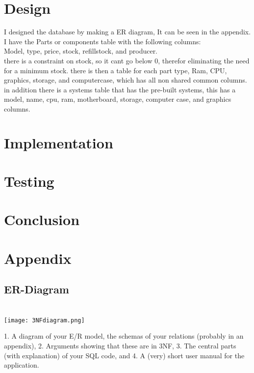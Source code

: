 \documentclass[a4paper,10pt,titlepage]{report}
\begin{document}
\section{Design}
I designed the database by making a ER diagram, It can be seen in the appendix.
I have the Parts or components table with the following columns:
\\
Model, type, price, stock, refillstock, and producer. 
\\
there is a constraint on stock, so it cant go below 0, therefor eliminating the need for a minimum stock.
there is then a table for each part type, Ram, CPU, graphics, storage, and computercase, which has all non shared common columns.
in addition there is a systems table that has the pre-built systems, this has a model, name, cpu, ram, motherboard, storage, computer case, and graphics columns.





\section{Implementation}
\section{Testing}
\section{Conclusion}
\section{Appendix}
\subsection{ER-Diagram}
\\
\texttt{[image: 3NFdiagram.png]}

1. A diagram of your E/R model, the schemas of your relations
(probably in an appendix),
2. Arguments showing that these are in 3NF,
3. The central parts (with explanation) of your SQL code, and
4. A (very) short user manual for the application.
\end{document}
